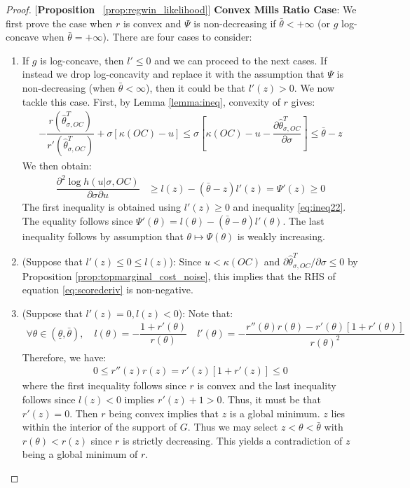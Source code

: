 \begin{proof}{[\textbf{Proposition} ~\ref{prop:regwin_likelihood}]}
\noindent \textbf{Convex Mills Ratio Case}: We first prove the case when $r$ is convex and $\Psi$ is non-decreasing if $\bar{\theta}<+\infty$ (or $g$ log-concave when $\bar{\theta}=+\infty$). There are four cases to consider:
\vspace{-5pt}
\begin{enumerate}[label=(\arabic*),ref=\thelemma(\arabic*)]
  \item If $g$ is log-concave, then $l'\leq 0$ and we can proceed to the next cases. If instead we drop log-concavity and replace it with the assumption that $\Psi$ is non-decreasing (when $\bar{\theta}<\infty$), then it could be that $l'(z) >  0$. We now tackle this case. First, by Lemma \ref{lemma:ineq}, convexity of $r$ gives:
  \begin{align}\label{eq:ineq22}
  -\dfrac{r(\hat{\theta}^T_{\sigma,OC})}{r'(\hat{\theta}^T_{\sigma,OC})} + \sigma[\kappa(OC)-u] \leq \sigma\left[\kappa(OC)-u-\dfrac{\partial \hat{\theta}^T_{\sigma,OC}}{\partial \sigma}\right] \leq \bar{\theta} - z
  \end{align}
  We then obtain:
  \begin{align*}
      \dfrac{\partial^2 \log h(u|\sigma,OC)}{\partial \sigma \partial u} &\geq l(z) - (\bar{\theta} - z)l'(z)  = \Psi'(z) \geq 0
  \end{align*}
  The first inequality is obtained using $l'(z)\geq 0$ and inequality \eqref{eq:ineq22}. The equality follows since $\Psi'(\theta) = l(\theta) - (\bar{\theta}-\theta)l'(\theta)$. The last inequality follows by assumption that $\theta\mapsto \Psi(\theta)$ is weakly increasing. 
  \item (Suppose that $l'(z) \leq  0 \leq l(z)$): Since $u<\kappa(OC)$ and $\partial \hat{\theta}^T_{\sigma,OC}/\partial \sigma \leq 0$ by Proposition \ref{prop:topmarginal_cost_noise}, this implies that the RHS of equation \eqref{eq:scorederiv} is non-negative. 
  \item (Suppose that $l'(z)= 0, l(z) < 0$): Note that:
  \begin{gather*}
    \forall \theta\in (\underline{\theta},\bar{\theta}),\quad l(\theta) = -\dfrac{1+r'(\theta)}{r(\theta)} \quad l'(\theta) = -\dfrac{r''(\theta)r(\theta) - r'(\theta)[1+r'(\theta)]}{r(\theta)^2}
  \end{gather*}
  Therefore, we have:
  \begin{align*}
    0 \leq r''(z)r(z) = r'(z)[1+r'(z)] \leq0 
  \end{align*}
  where the first inequality follows since $r$ is convex and the last inequality follows since $l(z)<0$ implies $r'(z)+1>0$. Thus, it must be that $r'(z) = 0$. Then $r$ being convex implies that $z$ is a global minimum. $z$ lies within the interior of the support of $G$. Thus we may select $z<\theta<\bar{\theta}$ with $r(\theta)<r(z)$ since $r$ is strictly decreasing. This yields a contradiction of $z$ being a global minimum of $r$. 

\end{enumerate}
\end{proof}
